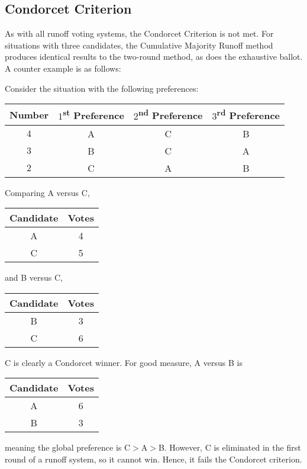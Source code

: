 \documentclass{article}
\newcommand{\super}{\textsuperscript}
\begin{document}
\subsection{Condorcet Criterion}
As with all runoff voting systems, the Condorcet Criterion is not met. For situations with three candidates, the Cumulative Majority Runoff method produces identical results to the two-round method, as does the exhaustive ballot. A counter example is as follows:

Consider the situation with the following preferences:
\begin{table}[H]\centering
\begin{tabular}{|c|c|c|c|}
\hline\rowcolor{headc}
Number & $1$\super{st} Preference & $2$\super{nd} Preference & $3$\super{rd} Preference\\
\hline
$4$ & A & C & B \\ \hline
$3$ & B & C & A \\ \hline
$2$ & C & A & B \\ \hline
\end{tabular}
\end{table}
Comparing A versus C,
\begin{table}[H]\centering
\begin{tabular}{|c|c|}
\hline\rowcolor{headc}
Candidate & Votes \\
\hline
A & 4 \\ \hline \rowcolor{advc}
C & 5 \\ \hline
\end{tabular}
\end{table}
and B versus C,
\begin{table}[H]\centering
\begin{tabular}{|c|c|}
\hline\rowcolor{headc}
Candidate & Votes \\
\hline
B & 3 \\ \hline \rowcolor{advc}
C & 6 \\ \hline
\end{tabular}
\end{table}
C is clearly a Condorcet winner. For good measure, A versus B is
\begin{table}[H]\centering
\begin{tabular}{|c|c|}
\hline\rowcolor{headc}
Candidate & Votes \\
\hline\rowcolor{advc}
A & 6 \\ \hline 
B & 3 \\ \hline
\end{tabular}
\end{table}
meaning the global preference is C$>$A$>$B. However, C is eliminated in the first round of a runoff system, so it cannot win. Hence, it fails the Condorcet criterion.
\end{document}
